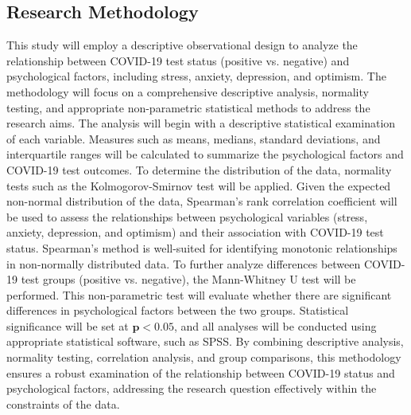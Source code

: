 \documentclass[a4paper]{article}
\begin{document}
\vspace{1em}
\subsection{Research Methodology}
\vspace{0.5em}
This study will employ a descriptive observational design to analyze the relationship between COVID-19 test status (positive vs. negative) and psychological factors,
including stress, anxiety, depression, and optimism.
\vspace{0.5em}\newline
The methodology will focus on a comprehensive descriptive analysis, normality testing, and appropriate non-parametric statistical methods to address the research aims.
The analysis will begin with a descriptive statistical examination of each variable. Measures such as means, medians, standard deviations, and interquartile ranges will be calculated to summarize the psychological factors and COVID-19 test outcomes.
To determine the distribution of the data, normality tests such as the Kolmogorov-Smirnov test will be applied.
\vspace{0.5em}\newline
Given the expected non-normal distribution of the data, Spearman’s rank correlation coefficient will be used to assess the relationships between psychological variables (stress, anxiety, depression, and optimism) and their association with COVID-19 test status.
Spearman’s method is well-suited for identifying monotonic relationships in non-normally distributed data.
\vspace{0.5em}\newline
To further analyze differences between COVID-19 test groups (positive vs. negative), the Mann-Whitney U test will be performed. This non-parametric test will evaluate whether there are significant differences in psychological factors between the two groups. Statistical significance will be set at 
\(\boldsymbol{p < 0.05 }\), and all analyses will be conducted using appropriate statistical software, such as SPSS.
\vspace{0.5em}\newline
By combining descriptive analysis, normality testing, correlation analysis, and group comparisons, this methodology ensures a robust examination of the relationship between COVID-19 status and psychological factors, addressing the research question effectively within the constraints of the data.


\vspace{1em}
\end{document}
